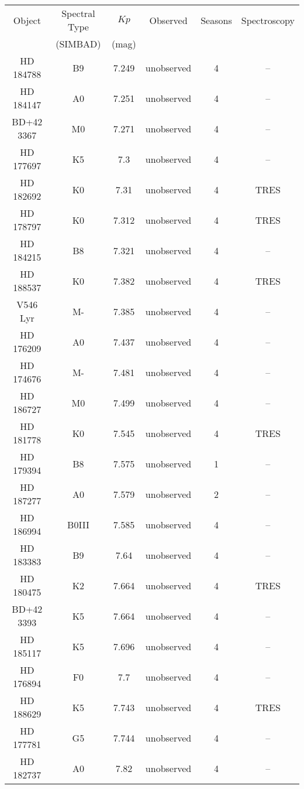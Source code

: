 \begin{table*}
\begin{tabular}{cccccc}
\hline \hline
Object & Spectral Type & $Kp$ & Observed & Seasons & Spectroscopy \\
 & (SIMBAD) & (mag) &  &  &  \\
\hline
HD 184788 & B9 & 7.249 & unobserved & 4 & -- \\
HD 184147 & A0 & 7.251 & unobserved & 4 & -- \\
BD+42 3367 & M0 & 7.271 & unobserved & 4 & -- \\
HD 177697 & K5 & 7.3 & unobserved & 4 & -- \\
HD 182692 & K0 & 7.31 & unobserved & 4 & TRES \\
HD 178797 & K0 & 7.312 & unobserved & 4 & TRES \\
HD 184215 & B8 & 7.321 & unobserved & 4 & -- \\
HD 188537 & K0 & 7.382 & unobserved & 4 & TRES \\
V546 Lyr & M- & 7.385 & unobserved & 4 & -- \\
HD 176209 & A0 & 7.437 & unobserved & 4 & -- \\
HD 174676 & M- & 7.481 & unobserved & 4 & -- \\
HD 186727 & M0 & 7.499 & unobserved & 4 & -- \\
HD 181778 & K0 & 7.545 & unobserved & 4 & TRES \\
HD 179394 & B8 & 7.575 & unobserved & 1 & -- \\
HD 187277 & A0 & 7.579 & unobserved & 2 & -- \\
HD 186994 & B0III & 7.585 & unobserved & 4 & -- \\
HD 183383 & B9 & 7.64 & unobserved & 4 & -- \\
HD 180475 & K2 & 7.664 & unobserved & 4 & TRES \\
BD+42 3393 & K5 & 7.664 & unobserved & 4 & -- \\
HD 185117 & K5 & 7.696 & unobserved & 4 & -- \\
HD 176894 & F0 & 7.7 & unobserved & 4 & -- \\
HD 188629 & K5 & 7.743 & unobserved & 4 & TRES \\
HD 177781 & G5 & 7.744 & unobserved & 4 & -- \\
HD 182737 & A0 & 7.82 & unobserved & 4 & -- \\

\end{tabular}
\end{table*}
